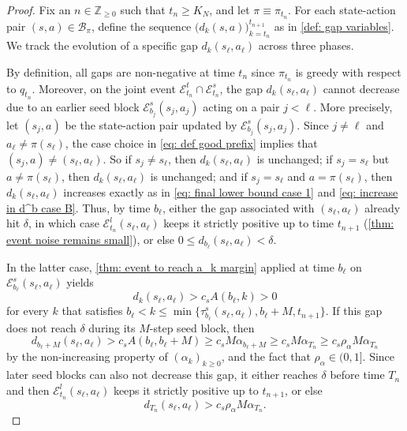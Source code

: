 \begin{proof}
Fix an $n \in \mathbb Z_{\ge 0}$ such that $t_n \ge K_N$, and let $\pi \equiv \pi_{t_n}$.
For each state-action pair $(s,a) \in \mathcal B_\pi$, define the sequence $\big( d_k(s,a) \big)_{k=t_n}^{t_{n+1}}$ as in \autoref{def: gap variables}.
We track the evolution of a specific gap $d_k(s_\ell, a_\ell)$ across three phases.

By definition, all gaps are non-negative at time $t_n$ since $\pi_{t_n}$ is greedy with respect to $q_{t_n}$.
Moreover, on the joint event \(\mathcal E^t_{t_n} \cap \mathcal E^s_{t_n}\), the gap \(d_k(s_\ell,a_\ell)\) cannot decrease due to an earlier seed block \(\mathcal E^s_{b_j}(s_j,a_j)\) acting on a pair \(j<\ell\).
More precisely, let $(s_j, a)$ be the state-action pair updated by $\mathcal E^s_{b_j}(s_j,a_j)$. Since $j \neq \ell$ and $a_\ell \neq \pi(s_\ell)$, the case choice in \eqref{eq: def good prefix} implies that $(s_j,a) \neq (s_\ell,a_\ell)$.
So if $s_j \neq s_\ell$, then \(d_k(s_\ell,a_\ell)\) is unchanged;
if $s_j = s_\ell$ but $a \neq \pi(s_\ell)$, then \(d_k(s_\ell,a_\ell)\) is unchanged;
and if $s_j = s_\ell$ and $a = \pi(s_\ell)$, then \(d_k(s_\ell,a_\ell)\) increases exactly as in \eqref{eq: final lower bound case 1} and \eqref{eq: increase in d^b case B}.
Thus, by time \(b_\ell\),
either the gap associated with $(s_\ell,a_\ell)$ already hit \(\delta\), in which case \(\mathcal E^l_{t_n}(s_\ell,a_\ell)\) keeps it strictly positive up to time $t_{n+1}$ (\autoref{thm: event noise remains small}), or else \(0 \le d_{b_\ell}(s_\ell, a_\ell) < \delta\).

In the latter case, \autoref{thm: event to reach a_k margin} applied at time \(b_\ell\) on \(\mathcal E^s_{b_\ell}(s_\ell,a_\ell)\) yields
\[
d_{k}(s_\ell,a_\ell) > c_s A(b_\ell, k) > 0
\]
for every $k$ that satisfies 
$b_\ell < k \le \min \{ \tau^s_{b_\ell}(s_\ell,a_\ell) , b_\ell + M , t_{n+1} \}$.
If this gap does not reach \(\delta\) during its $M$-step seed block, then
\[
d_{b_\ell+M}(s_\ell,a_\ell) 
> c_s A(b_\ell, b_\ell+M)
\ge c_s M \alpha_{b_\ell+M}
\ge c_s M \alpha_{T_n}
\ge c_s \rho_\alpha M \alpha_{T_n}
\]
by the non-increasing property of $(\alpha_k)_{k \ge 0}$, and the fact that $\rho_\alpha \in (0,1]$.
Since later seed blocks can also not decrease this gap,
it either reaches $\delta$ before time $T_n$ and then \(\mathcal E^l_{t_n}(s_\ell,a_\ell)\) keeps it strictly positive up to $t_{n+1}$,
or else
\[
d_{T_n}(s_\ell,a_\ell)
> c_s \rho_\alpha M \alpha_{T_n}.
\]


\end{proof}
